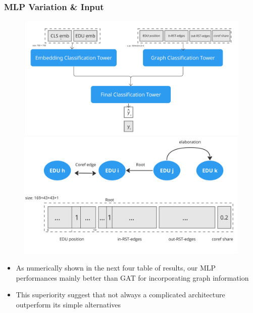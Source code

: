 \documentclass{beamer}
\begin{document}
\begin{frame}
\frametitle{MLP Variation \& Input}


\begin{figure}[ht]
    \centering
    \begin{minipage}{0.5\textwidth}
            \includegraphics[scale=.05]{imgs/novel_approach.jpg}
            \end{minipage}\hfill
    \begin{minipage}{0.5\textwidth}
    \includegraphics[scale=.05]{imgs/MLP_input_format.jpg}
    \end{minipage}
\end{figure}
\begin{itemize}
    \item As numerically shown in the next four table of results, our MLP performances mainly better than GAT for incorporating graph information
    \item This superiority suggest that not always a complicated architecture outperform its simple alternatives
\end{itemize}

\end{frame}
\end{document}
